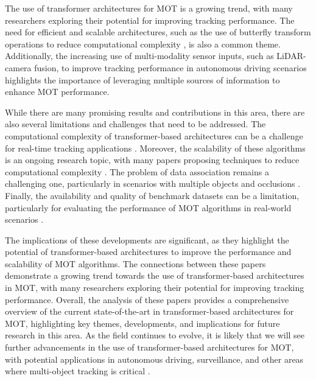 \documentclass[conference]{IEEEtran}
\begin{document}
The use of transformer architectures for MOT is a growing trend, with many researchers exploring their potential for improving tracking performance. The need for efficient and scalable architectures, such as the use of butterfly transform operations to reduce computational complexity \cite{ButterflyTransform}, is also a common theme. Additionally, the increasing use of multi-modality sensor inputs, such as LiDAR-camera fusion, to improve tracking performance in autonomous driving scenarios \cite{LiDARCamerFusion} highlights the importance of leveraging multiple sources of information to enhance MOT performance.

While there are many promising results and contributions in this area, there are also several limitations and challenges that need to be addressed. The computational complexity of transformer-based architectures can be a challenge for real-time tracking applications \cite{ComputationalComplexity}. Moreover, the scalability of these algorithms is an ongoing research topic, with many papers proposing techniques to reduce computational complexity \cite{Scalability}. The problem of data association remains a challenging one, particularly in scenarios with multiple objects and occlusions \cite{DataAssociation}. Finally, the availability and quality of benchmark datasets can be a limitation, particularly for evaluating the performance of MOT algorithms in real-world scenarios \cite{BenchmarkDatasets}.

The implications of these developments are significant, as they highlight the potential of transformer-based architectures to improve the performance and scalability of MOT algorithms. The connections between these papers demonstrate a growing trend towards the use of transformer-based architectures in MOT, with many researchers exploring their potential for improving tracking performance. Overall, the analysis of these papers provides a comprehensive overview of the current state-of-the-art in transformer-based architectures for MOT, highlighting key themes, developments, and implications for future research in this area. As the field continues to evolve, it is likely that we will see further advancements in the use of transformer-based architectures for MOT, with potential applications in autonomous driving, surveillance, and other areas where multi-object tracking is critical \cite{FutureDirections}.
\end{document}
